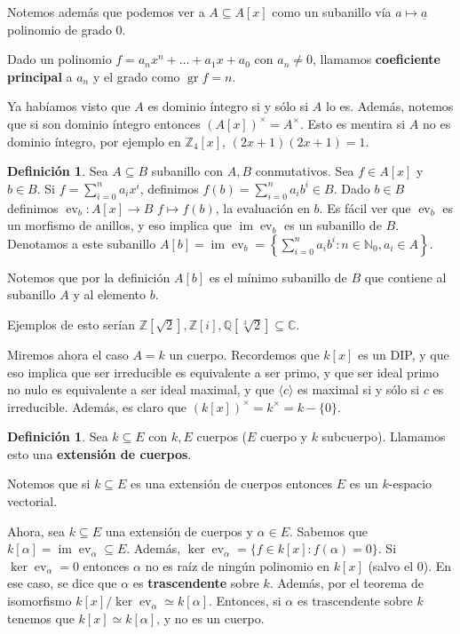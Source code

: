 \documentclass[12pt]{book}
\theoremstyle{definition}
\newtheorem{defn}[teo]{Definición}
\newcommand{\CC}{\mathbb{C}}
\newcommand{\ZZ}{\mathbb{Z}}      %
\newcommand{\NN}{\mathbb{N}}
\newcommand{\QQ}{\mathbb{Q}}
\DeclareMathOperator{\im}{im}
\DeclareMathOperator{\gr}{gr}
\DeclareMathOperator{\ev}{ev}
\begin{document}
Notemos además que podemos ver a $A\subseteq A[x]$ como un subanillo vía $a\mapsto \underline{a}$ polinomio de grado $0$.

Dado un polinomio $f=a_n x^n + \ldots + a_1 x + a_0$ con $a_n\neq 0$, llamamos \textbf{coeficiente principal} a $a_n$ y el grado como $\gr f = n$.

Ya habíamos visto que $A$ es dominio íntegro si y sólo si $A$ lo es. Además, notemos que si son dominio íntegro entonces $(A[x])^\times  = A^\times$. Esto es mentira si $A$ no es dominio íntegro, por ejemplo en $\ZZ_4[x]$, $(2x+1)(2x+1) = 1$.

\begin{defn}
Sea $A\subseteq B$ subanillo con $A,B$ conmutativos. Sea $f\in A[x]$ y $b\in B$. Si $f=\displaystyle\sum_{i=0}^n a_i x^i$, definimos $f(b) = \displaystyle\sum_{i=0}^n a_i b^i\in B$. Dado $b\in B$ definimos $\ev_b:A[x]\to B$ $f\mapsto f(b)$, la evaluación en $b$. Es fácil ver que $\ev_b$ es un morfismo de anillos, y eso implica que $\im\ev_b$ es un subanillo de $B$. Denotamos a este subanillo $A[b]=\im\ev_b = \left\{\displaystyle\sum_{i=0}^n a_ib^i : n\in\NN_0 , a_i\in A\right\}$.
\end{defn}

Notemos que por la definición $A[b]$ es el mínimo subanillo de $B$ que contiene al subanillo $A$ y al elemento $b$.

Ejemplos de esto serían $\ZZ[\sqrt{2}],\ZZ[i],\QQ[\sqrt[3]{2}]\subseteq \CC$.

Miremos ahora el caso $A=k$ un cuerpo. Recordemos que $k[x]$ es un DIP, y que eso implica que ser irreducible es equivalente a ser primo, y que ser ideal primo no nulo es equivalente a ser ideal maximal, y que $\langle c\rangle$ es maximal si y sólo si $c$ es irreducible. Además, es claro que $(k[x])^\times = k^\times = k-\{0\}$.

\begin{defn}
Sea $k\subseteq E$ con $k,E$ cuerpos ($E$ cuerpo y $k$ subcuerpo). Llamamos esto una \textbf{extensión de cuerpos}.
\end{defn}

Notemos que si $k\subseteq E$ es una extensión de cuerpos entonces $E$ es un $k$-espacio vectorial.

Ahora, sea $k\subseteq E$ una extensión de cuerpos y $\alpha\in E$. Sabemos que $k[\alpha]=\im\ev_\alpha\subseteq E$. Además, $\ker\ev_\alpha = \{f\in k[x] : f(\alpha)=0\}$. Si $\ker\ev_\alpha = 0$ entonces $\alpha$ no es raíz de ningún polinomio en $k[x]$ (salvo el $0$). En ese caso, se dice que $\alpha$ es \textbf{trascendente} sobre $k$. Además, por el teorema de isomorfismo $k[x]/\ker\ev_\alpha \simeq k[\alpha]$. Entonces, si $\alpha$ es trascendente sobre $k$ tenemos que $k[x]\simeq k[\alpha]$, y no es un cuerpo.
\end{document}
